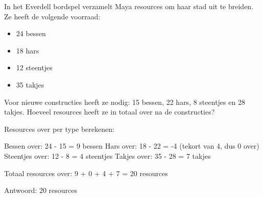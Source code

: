 \begin{opgave}
In het Everdell bordspel verzamelt Maya resources om haar stad uit te breiden. 
Ze heeft de volgende voorraad:
\begin{itemize}
\item 24 bessen
\item 18 hars  
\item 12 steentjes
\item 35 takjes
\end{itemize}
Voor nieuwe constructies heeft ze nodig: 15 bessen, 22 hars, 8 steentjes en 28 
takjes. Hoeveel resources heeft ze in totaal over na de constructies?
\end{opgave}

\begin{oplossing}
Resources over per type berekenen:

Bessen over: 24 - 15 = 9 bessen
Hars over: 18 - 22 = -4 (tekort van 4, dus 0 over)
Steentjes over: 12 - 8 = 4 steentjes  
Takjes over: 35 - 28 = 7 takjes

Totaal resources over:
9 + 0 + 4 + 7 = 20 resources

Antwoord: 20 resources
\end{oplossing}